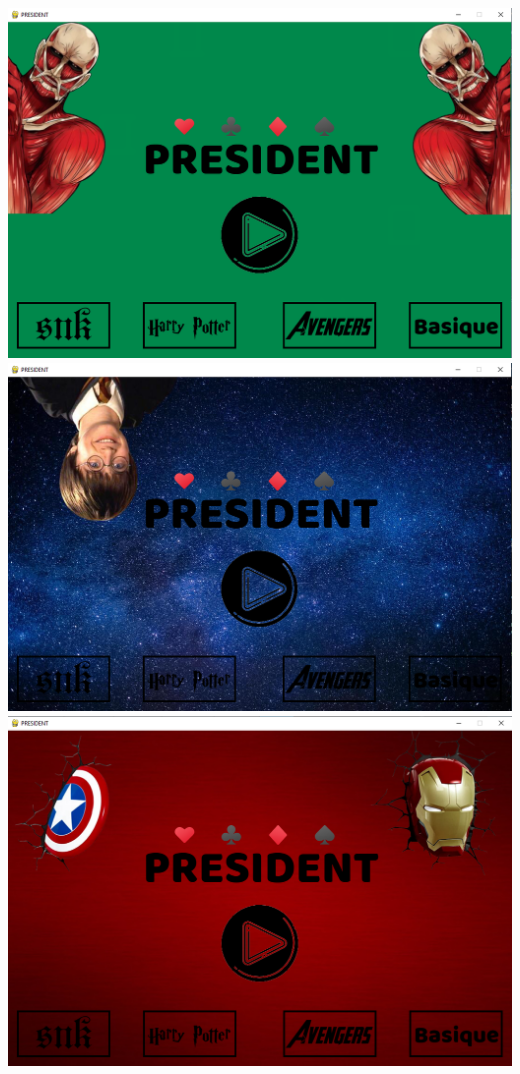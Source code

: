 \documentclass[french,12pt]{article}
\begin{document}
\begin{center}
	\includegraphics[scale=0.3]{img/accueil_snk.png}\\
	\includegraphics[scale=0.3]{img/accueil_hp.png}\\
	\includegraphics[scale=0.3]{img/accueil_avengers.png}
\end{center}
\end{document}
